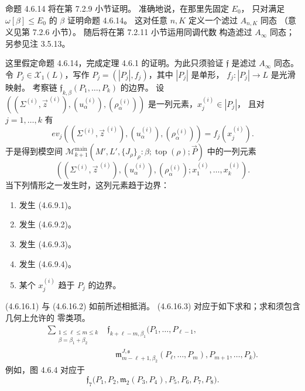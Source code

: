 命题 4.6.14 将在第 7.2.9 小节证明。
准确地说，在那里先固定 $E_0$，
只对满足 $\omega[\beta]\le E_0$
的 $\beta$ 证明命题 4.6.14。
这对任意 $n,K$ 定义一个滤过 $A_{n,K}$ 同态
（意义见第 7.2.6 小节）。
随后将在第 7.2.11 小节运用同调代数
构造滤过 $A_\infty$ 同态；
另参见注 3.5.13。

这里假定命题 4.6.14，完成定理 4.6.1
的证明。为此只须验证 $\mathfrak f$
是滤过 $A_\infty$ 同态。
令 $P_j\in\mathcal X_1(L)$，写作
$P_j=(|P_j|,f_j)$，其中 $|P_j|$ 是单形，
$f_j\colon|P_j|\to L$ 是光滑映射。
考察链
$\mathfrak f_{k,\beta}(P_1,\ldots,P_k)$ 的边界。
设
$((\Sigma^{(i)},\vec z^{\,(i)}),
(u_\alpha^{(i)}),(\rho_\alpha^{(i)}))$
是一列元素，$x_j^{(i)}\in|P_j|$，
且对 $j=1,\ldots,k$ 有
\[
 ev_j((\Sigma^{(i)},\vec z^{\,(i)}),
 (u_\alpha^{(i)}),(\rho_\alpha^{(i)}))
 =f_j(x_j^{(i)}).
\]
于是得到模空间
$\mathcal M_{k+1}^{\mathrm{main}}
(M',L',\{J_\rho\}_\rho:\beta;\operatorname{top}(\rho);\vec P)$
中的一列元素
\[
 ((\Sigma^{(i)},\vec z^{\,(i)}),
 (u_\alpha^{(i)}),(\rho_\alpha^{(i)});
 x_1^{(i)},\ldots,x_k^{(i)}).
\]
当下列情形之一发生时，这列元素趋于边界：
\begin{enumerate}[label=\textup{(4.6.16.\arabic*)},leftmargin=6.1em]
 \item 发生 (4.6.9.1)。
 \item 发生 (4.6.9.2)。
 \item 发生 (4.6.9.3)。
 \item 发生 (4.6.9.4)。
 \item 某个 $x_j^{(i)}$ 趋于 $P_j$ 的边界。
\end{enumerate}

(4.6.16.1) 与 (4.6.16.2) 如前所述相抵消。
(4.6.16.3) 对应于如下求和；求和须包含几何上允许的
零类项。
\begin{equation}
 \begin{aligned}
 \sum_{\substack{1\le\ell\le m\le k\\
                  \beta=\beta_1+\beta_2}}
 &\mathfrak f_{k+\ell-m,\beta_1}
 \bigl(P_1,\ldots,P_{\ell-1},\\
 &\quad\mathfrak m^{J,\mathfrak s}_{m-\ell+1,\beta_2}
 (P_\ell,\ldots,P_m),
 P_{m+1},\ldots,P_k\bigr).
 \end{aligned}
\tag{4.6.17}\label{eq:4-6-17}
\end{equation}
例如，图 4.6.4 对应于
\[
 \mathfrak f_7\bigl(
 P_1,P_2,\mathfrak m_2(P_3,P_4),
 P_5,P_6,P_7,P_8\bigr).
\]

